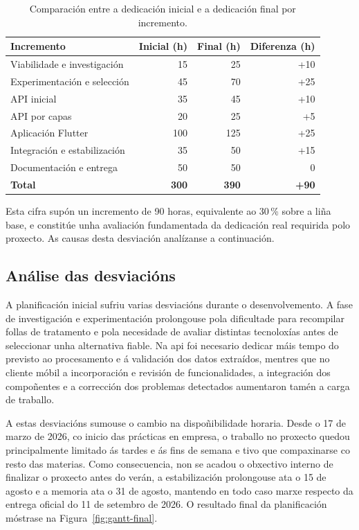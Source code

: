 \begin{table}[h]
    \centering
    \renewcommand{\arraystretch}{1.2}
    \caption{Comparación entre a dedicación inicial e a dedicación final por incremento.}
    \label{tab:comparacion-horas}
    \small 
    \begin{tabular}{lrrr}
        \toprule
        \textbf{Incremento} &
        \textbf{Inicial (h)} &
        \textbf{Final (h)} &
        \textbf{Diferenza (h)} \\
        \midrule
        Viabilidade e investigación & 15 & 25 & +10 \\
        Experimentación e selección & 45 & 70 & +25 \\
        API inicial & 35 & 45 & +10 \\
        API por capas & 20 & 25 & +5 \\
        Aplicación Flutter & 100 & 125 & +25 \\
        Integración e estabilización & 35 & 50 & +15 \\
        Documentación e entrega & 50 & 50 & 0 \\
        \midrule
        \textbf{Total} & \textbf{300} & \textbf{390} & \textbf{+90} \\
        \bottomrule
    \end{tabular}
\end{table}

Esta cifra supón un incremento de 90 horas, equivalente ao 30\,\% sobre a liña base, e constitúe unha avaliación fundamentada da dedicación real requirida polo proxecto. As causas desta desviación analízanse a continuación.

\subsection{Análise das desviacións}
\label{subsec:analise-desviacions}

A planificación inicial sufriu varias desviacións durante o desenvolvemento. A fase de investigación e experimentación prolongouse pola dificultade para recompilar follas de tratamento e pola necesidade de avaliar distintas tecnoloxías antes de seleccionar unha alternativa fiable. Na \gls{api} foi necesario dedicar máis tempo do previsto ao procesamento e á validación dos datos extraídos, mentres que no cliente móbil a incorporación e revisión de funcionalidades, a integración dos compoñentes e a corrección dos problemas detectados aumentaron tamén a carga de traballo.

A estas desviacións sumouse o cambio na dispoñibilidade horaria. Desde o 17 de marzo de 2026, co inicio das prácticas en empresa, o traballo no proxecto quedou principalmente limitado ás tardes e ás fins de semana e tivo que compaxinarse co resto das materias. Como consecuencia, non se acadou o obxectivo interno de finalizar o proxecto antes do verán, a estabilización prolongouse ata o 15 de agosto e a memoria ata o 31 de agosto, mantendo en todo caso marxe respecto da entrega oficial do 11 de setembro de 2026. O resultado final da planificación móstrase na Figura~\ref{fig:gantt-final}.

